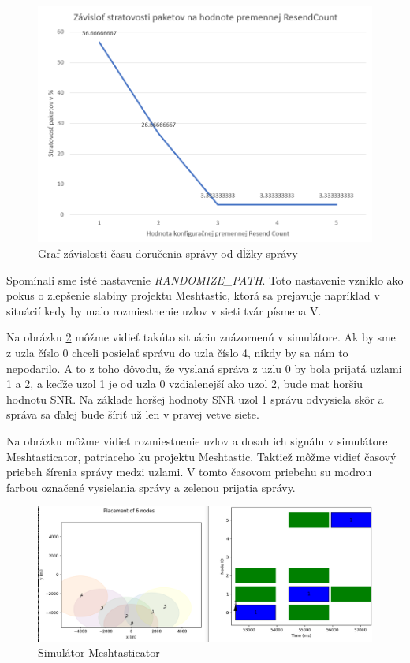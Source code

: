\documentclass[slovak,master]{diploma}
\begin{document}
\begin{figure}[h!]
  \centering
  \includegraphics[width=1\textwidth]{Figures/packetLossResendCount.png}
  \caption{Graf závislosti času doručenia správy od dĺžky správy}
  \label{fig:plResend}
\end{figure}

\newpage
Spomínali sme isté nastavenie \emph{RANDOMIZE\_PATH}. Toto nastavenie vzniklo ako pokus o zlepšenie slabiny 
projektu Meshtastic, ktorá sa prejavuje napríklad v situácií kedy by malo rozmiestnenie uzlov v sieti tvár písmena V.

Na obrázku \ref{fig:mestasticV} môžme vidieť takúto situáciu znázornenú v simulátore. Ak by sme z uzla číslo 0 chceli posielať správu do uzla číslo 4, nikdy by sa nám to nepodarilo.
A to z toho dôvodu, že vyslaná správa z uzlu 0 by bola prijatá uzlami 1 a 2, a keďže uzol 1 je od uzla 0 vzdialenejší ako uzol 2, bude mat horšiu hodnotu SNR.
Na základe horšej hodnoty SNR uzol 1 správu odvysiela skôr a správa sa ďalej bude šíriť už len v pravej vetve siete.

Na obrázku môžme vidieť rozmiestnenie uzlov a dosah ich signálu v simulátore Meshtasticator, patriaceho ku projektu Meshtastic. Taktiež môžme vidieť časový priebeh šírenia správy medzi uzlami. 
V tomto časovom priebehu su modrou farbou označené vysielania správy a zelenou prijatia správy.

\begin{figure}[h!]
  \centering
  \includegraphics[width=1\textwidth]{Figures/meshtasticV.png}
  \caption{Simulátor Meshtasticator}
  \label{fig:mestasticV}
\end{figure}
\end{document}
